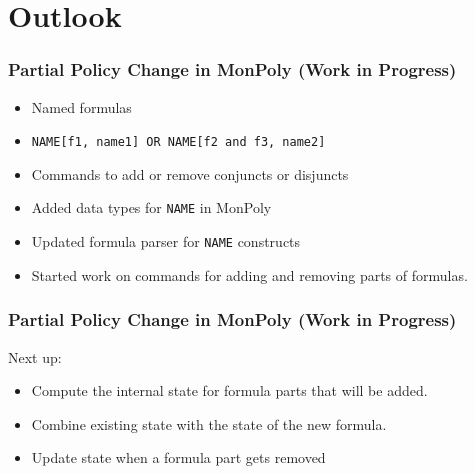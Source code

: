\section{Outlook}

\begin{frame}
    \frametitle{Partial Policy Change in MonPoly (Work in Progress)}
    \begin{itemize}
        \item Named formulas
        \item \texttt{NAME[f1, name1] OR NAME[f2 and f3, name2]}
        \item Commands to add or remove conjuncts or disjuncts
        \item Added data types for \texttt{NAME} in MonPoly
        \item Updated formula parser for \texttt{NAME} constructs
        \item Started work on commands for adding and removing parts of formulas.
    \end{itemize}
\end{frame}

\begin{frame}
    \frametitle{Partial Policy Change in MonPoly (Work in Progress)}
    Next up:

    \begin{itemize}
        \item Compute the internal state for formula parts that will be added.
        \item Combine existing state with the state of the new formula.
        \item Update state when a formula part gets removed
    \end{itemize}

    
\end{frame}